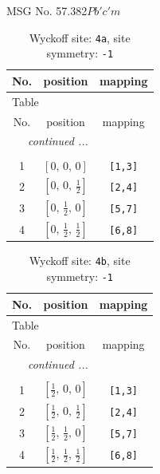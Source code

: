 \documentclass[fleqn,8pt]{jsarticle}
\begin{document}
\setcounter{MaxMatrixCols}{32}

\renewcommand{\tablename}{Table~}
\renewcommand{\figurename}{Figure~}
\begin{center}
\LARGE
MSG No. 57.382\quad$Pb'c'm$
\end{center}
\renewcommand{\arraystretch}{1.2}
\begin{longtable}{ccc}
\caption{Wyckoff site: {\tt 4a}, site symmetry: {\tt -1}}
 \\
 \hline \hline
No. & position & mapping \\ \hline \endfirsthead

\multicolumn{2}{l}{\tablename\ \thetable{}} \\
 \hline \hline
No. & position & mapping \\ \hline \endhead

 \hline \hline
\multicolumn{2}{r}{\footnotesize\it continued ...} \\ \endfoot

 \hline \hline
\multicolumn{2}{r}{} \\ \endlastfoot

1 & $\left[ 0,\, 0,\, 0 \right]$ & {\tt [1,3]} \\ \hline
2 & $\left[ 0,\, 0,\, \frac{1}{2} \right]$ & {\tt [2,4]} \\ \hline
3 & $\left[ 0,\, \frac{1}{2},\, 0 \right]$ & {\tt [5,7]} \\ \hline
4 & $\left[ 0,\, \frac{1}{2},\, \frac{1}{2} \right]$ & {\tt [6,8]} \\
\end{longtable}
\renewcommand{\arraystretch}{1.2}
\begin{longtable}{ccc}
\caption{Wyckoff site: {\tt 4b}, site symmetry: {\tt -1}}
 \\
 \hline \hline
No. & position & mapping \\ \hline \endfirsthead

\multicolumn{2}{l}{\tablename\ \thetable{}} \\
 \hline \hline
No. & position & mapping \\ \hline \endhead

 \hline \hline
\multicolumn{2}{r}{\footnotesize\it continued ...} \\ \endfoot

 \hline \hline
\multicolumn{2}{r}{} \\ \endlastfoot

1 & $\left[ \frac{1}{2},\, 0,\, 0 \right]$ & {\tt [1,3]} \\ \hline
2 & $\left[ \frac{1}{2},\, 0,\, \frac{1}{2} \right]$ & {\tt [2,4]} \\ \hline
3 & $\left[ \frac{1}{2},\, \frac{1}{2},\, 0 \right]$ & {\tt [5,7]} \\ \hline
4 & $\left[ \frac{1}{2},\, \frac{1}{2},\, \frac{1}{2} \right]$ & {\tt [6,8]} \\
\end{longtable}
\end{document}
